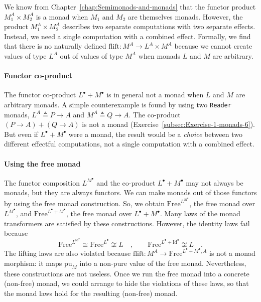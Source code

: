We know from Chapter~\ref{chap:Semimonads-and-monads} that the functor
product $M_{1}^{A}\times M_{2}^{A}$ is a monad when $M_{1}$ and
$M_{2}$ are themselves monads. However, the product $M_{1}^{A}\times M_{2}^{A}$
describes two separate computations with two separate effects. Instead,
we need a single computation with a combined effect. Formally, we
find that there is no naturally defined $\text{flift}:M^{A}\rightarrow L^{A}\times M^{A}$
because we cannot create values of type $L^{A}$ out of values of
type $M^{A}$ when monads $L$ and $M$ are arbitrary.

\paragraph{Functor co-product}

The functor co-product $L^{\bullet}+M^{\bullet}$ is in general not
a monad when $L$ and $M$ are arbitrary monads. A simple counterexample
is found by using two \lstinline!Reader! monads, $L^{A}\triangleq P\rightarrow A$
and $M^{A}\triangleq Q\rightarrow A$. The co-product $\left(P\rightarrow A\right)+\left(Q\rightarrow A\right)$
is not a monad (Exercise~\ref{subsec:Exercise-1-monads-6}). But
even if $L^{\bullet}+M^{\bullet}$ were a monad, the result would
be a \emph{choice} between two different effectful computations, not
a single computation with a combined effect.

\paragraph{Using the free monad}

The functor composition $L^{M^{\bullet}}$ and the co-product $L^{\bullet}+M^{\bullet}$
may not always be monads, but they are always functors. We can make
monads out of those functors by using the free monad construction.
So, we obtain $\text{Free}^{L^{M^{\bullet}}}$, the free monad over
$L^{M^{\bullet}}$, and $\text{Free}^{L^{\bullet}+M^{\bullet}}$,
the free monad over $L^{\bullet}+M^{\bullet}$. Many laws of the monad
transformers are satisfied by these constructions. However, the identity
laws fail because
\[
\text{Free}^{L^{\text{Id}^{\bullet}}}\cong\text{Free}^{L^{\bullet}}\not\cong L\quad,\quad\quad\text{Free}^{L^{\bullet}+\text{Id}^{\bullet}}\not\cong L\quad.
\]
The lifting laws are also violated because $\text{flift}:M^{A}\rightarrow\text{Free}^{L^{\bullet}+M^{\bullet},A}$
is not a monad morphism: it maps $\text{pu}_{M}$ into a non-pure
value of the free monad. Nevertheless, these constructions are not
useless. Once we run the free monad into a concrete (non-free) monad,
we could arrange to hide the violations of these laws, so that the
monad laws hold for the resulting (non-free) monad.

